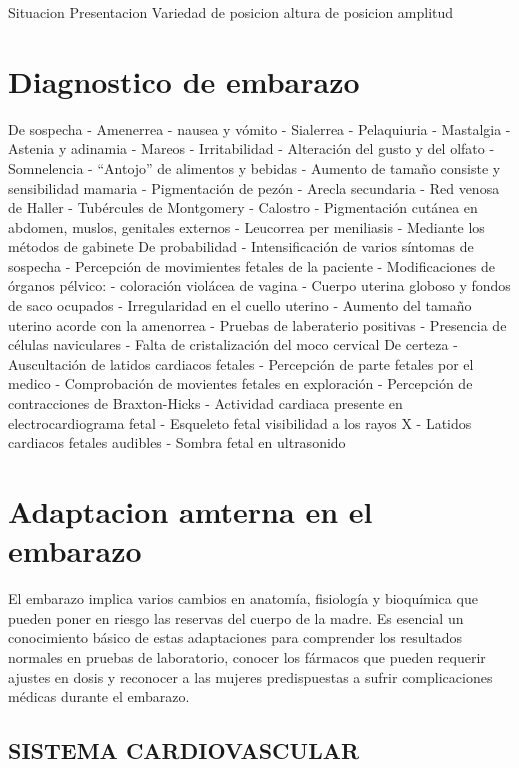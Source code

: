 \documentclass[
]{article}
\begin{document}
Situacion Presentacion Variedad de posicion altura de posicion amplitud

\hypertarget{diagnostico-de-embarazo}{%
\section{Diagnostico de embarazo}\label{diagnostico-de-embarazo}}

De sospecha - Amenerrea - nausea y vómito - Sialerrea - Pelaquiuria -
Mastalgia - Astenia y adinamia - Mareos - Irritabilidad - Alteración del
gusto y del olfato - Somnelencia - ``Antojo'' de alimentos y bebidas -
Aumento de tamaño consiste y sensibilidad mamaria - Pigmentación de
pezón - Arecla secundaria - Red venosa de Haller - Tubércules de
Montgomery - Calostro - Pigmentación cutánea en abdomen, muslos,
genitales externos - Leucorrea per meniliasis - Mediante los métodos de
gabinete De probabilidad - Intensificación de varios síntomas de
sospecha - Percepción de movimientes fetales de la paciente -
Modificaciones de órganos pélvico: - coloración violácea de vagina -
Cuerpo uterina globoso y fondos de saco ocupados - Irregularidad en el
cuello uterino - Aumento del tamaño uterino acorde con la amenorrea -
Pruebas de laberaterio positivas - Presencia de células naviculares -
Falta de cristalización del moco cervical De certeza - Auscultación de
latidos cardiacos fetales - Percepción de parte fetales por el medico -
Comprobación de movientes fetales en exploración - Percepción de
contracciones de Braxton-Hicks - Actividad cardiaca presente en
electrocardiograma fetal - Esqueleto fetal visibilidad a los rayos X -
Latidos cardiacos fetales audibles - Sombra fetal en ultrasonido

\hypertarget{adaptacion-amterna-en-el-embarazo}{%
\section{Adaptacion amterna en el
embarazo}\label{adaptacion-amterna-en-el-embarazo}}

El embarazo implica varios cambios en anatomía, fisiología y bioquímica
que pueden poner en riesgo las reservas del cuerpo de la madre. Es
esencial un conocimiento básico de estas adaptaciones para comprender
los resultados normales en pruebas de laboratorio, conocer los fármacos
que pueden requerir ajustes en dosis y reconocer a las mujeres
predispuestas a sufrir complicaciones médicas durante el embarazo.

\hypertarget{sistema-cardiovascular}{%
\subsection{SISTEMA CARDIOVASCULAR}\label{sistema-cardiovascular}}
\end{document}
